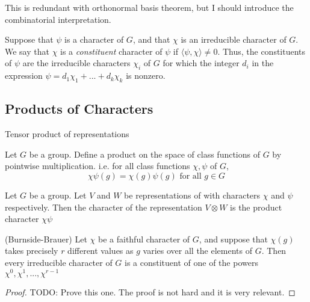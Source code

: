 This is redundant with orthonormal basis theorem, but I should introduce the combinatorial interpretation.

\begin{definition}
    Suppose that $\psi$ is a character of $G$, and that $\chi$ is an irreducible character of $G$. We say that 
    $\chi$ is a \emph{constituent} character of $\psi$ if $\langle \psi, \chi \rangle \neq 0$. Thus, the 
    constituents of $\psi$ are the irreducible characters $\chi_i$ of $G$ for which the integer $d_i$ in the 
    expression $\psi = d_1\chi_1 + ... + d_k\chi_k$ is nonzero.
\end{definition}





\subsection{Products of Characters}

\begin{definition}
    Tensor product of representations
\end{definition}

\begin{definition}
    Let $G$ be a group. Define a product on the space of class functions of $G$ by pointwise multiplication. i.e.
    for all class functions $\chi, \psi$ of $G$, 
    \[
        \chi\psi(g) = \chi(g)\psi(g) \text{ for all } g \in G
    \]
\end{definition}


\begin{proposition}
    Let $G$ be a group. Let $V$ and $W$ be representations of with characters $\chi$ and $\psi$ respectively. Then 
    the character of the representation $V \otimes W$ is the product character $\chi\psi$
\end{proposition}


\begin{theorem}(Burnside-Brauer)
    Let $\chi$ be a faithful character of $G$, and suppose that $\chi(g)$ takes precisely $r$ different values as 
    $g$ varies over all the elements of $G$. Then every irreducible character of $G$ is a constituent of one of the 
    powers $\chi^0, \chi^1, ... , \chi^{r-1}$
\end{theorem}

\begin{proof}
    TODO: Prove this one. The proof is not hard and it is very relevant.
\end{proof}
